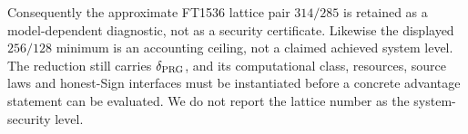 Consequently the approximate FT1536 lattice pair $314/285$ is retained
as a model-dependent diagnostic, not as a security certificate.
Likewise the displayed $256/128$ minimum is an accounting ceiling,
not a claimed achieved system level. The reduction still carries
$\delta_{\mathrm{PRG}}$, and its computational class, resources, source laws and
honest-Sign interfaces must be instantiated before a concrete
advantage statement can be evaluated. We do not report the lattice
number as the system-security level.
